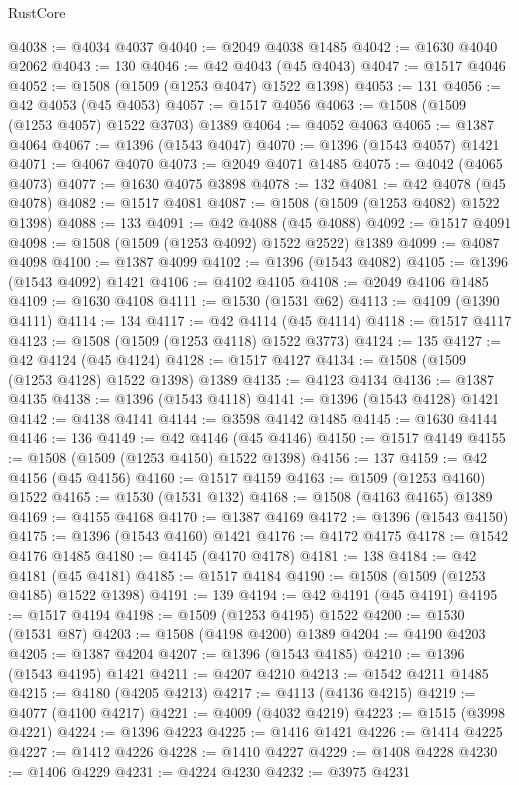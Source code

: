\begin{lexlean}{RustCore}
\begin{coremodule}
@4038 := @4034 @4037
@4040 := @2049 @4038 @1485
@4042 := @1630 @4040 @2062
@4043 := 130
@4046 := @42 @4043 (@45 @4043)
@4047 := @1517 @4046
@4052 := @1508 (@1509 (@1253 @4047) @1522 @1398)
@4053 := 131
@4056 := @42 @4053 (@45 @4053)
@4057 := @1517 @4056
@4063 := @1508 (@1509 (@1253 @4057) @1522 @3703) @1389
@4064 := @4052 @4063
@4065 := @1387 @4064
@4067 := @1396 (@1543 @4047)
@4070 := @1396 (@1543 @4057) @1421
@4071 := @4067 @4070
@4073 := @2049 @4071 @1485
@4075 := @4042 (@4065 @4073)
@4077 := @1630 @4075 @3898
@4078 := 132
@4081 := @42 @4078 (@45 @4078)
@4082 := @1517 @4081
@4087 := @1508 (@1509 (@1253 @4082) @1522 @1398)
@4088 := 133
@4091 := @42 @4088 (@45 @4088)
@4092 := @1517 @4091
@4098 := @1508 (@1509 (@1253 @4092) @1522 @2522) @1389
@4099 := @4087 @4098
@4100 := @1387 @4099
@4102 := @1396 (@1543 @4082)
@4105 := @1396 (@1543 @4092) @1421
@4106 := @4102 @4105
@4108 := @2049 @4106 @1485
@4109 := @1630 @4108
@4111 := @1530 (@1531 @62)
@4113 := @4109 (@1390 @4111)
@4114 := 134
@4117 := @42 @4114 (@45 @4114)
@4118 := @1517 @4117
@4123 := @1508 (@1509 (@1253 @4118) @1522 @3773)
@4124 := 135
@4127 := @42 @4124 (@45 @4124)
@4128 := @1517 @4127
@4134 := @1508 (@1509 (@1253 @4128) @1522 @1398) @1389
@4135 := @4123 @4134
@4136 := @1387 @4135
@4138 := @1396 (@1543 @4118)
@4141 := @1396 (@1543 @4128) @1421
@4142 := @4138 @4141
@4144 := @3598 @4142 @1485
@4145 := @1630 @4144
@4146 := 136
@4149 := @42 @4146 (@45 @4146)
@4150 := @1517 @4149
@4155 := @1508 (@1509 (@1253 @4150) @1522 @1398)
@4156 := 137
@4159 := @42 @4156 (@45 @4156)
@4160 := @1517 @4159
@4163 := @1509 (@1253 @4160) @1522
@4165 := @1530 (@1531 @132)
@4168 := @1508 (@4163 @4165) @1389
@4169 := @4155 @4168
@4170 := @1387 @4169
@4172 := @1396 (@1543 @4150)
@4175 := @1396 (@1543 @4160) @1421
@4176 := @4172 @4175
@4178 := @1542 @4176 @1485
@4180 := @4145 (@4170 @4178)
@4181 := 138
@4184 := @42 @4181 (@45 @4181)
@4185 := @1517 @4184
@4190 := @1508 (@1509 (@1253 @4185) @1522 @1398)
@4191 := 139
@4194 := @42 @4191 (@45 @4191)
@4195 := @1517 @4194
@4198 := @1509 (@1253 @4195) @1522
@4200 := @1530 (@1531 @87)
@4203 := @1508 (@4198 @4200) @1389
@4204 := @4190 @4203
@4205 := @1387 @4204
@4207 := @1396 (@1543 @4185)
@4210 := @1396 (@1543 @4195) @1421
@4211 := @4207 @4210
@4213 := @1542 @4211 @1485
@4215 := @4180 (@4205 @4213)
@4217 := @4113 (@4136 @4215)
@4219 := @4077 (@4100 @4217)
@4221 := @4009 (@4032 @4219)
@4223 := @1515 (@3998 @4221)
@4224 := @1396 @4223
@4225 := @1416 @1421
@4226 := @1414 @4225
@4227 := @1412 @4226
@4228 := @1410 @4227
@4229 := @1408 @4228
@4230 := @1406 @4229
@4231 := @4224 @4230
@4232 := @3975 @4231

\end{coremodule}
\end{lexlean}
